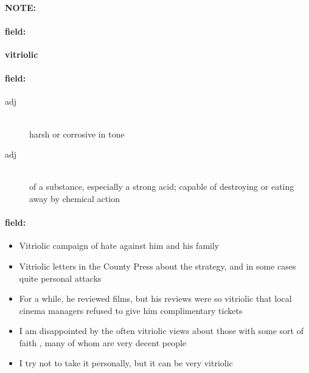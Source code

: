 \documentclass[12pt]{article}
\newenvironment{note}{\paragraph{NOTE:}}{}
\newenvironment{field}{\paragraph{field:}}{}
\begin{document}
\begin{note}
\begin{field}
\textbf{\large vitriolic}
\end{field}


\begin{field}
\begin{description}
\item[adj] \hfill \\ 
harsh or corrosive in tone

\item[adj] \hfill \\ 
of a substance, especially a strong acid; capable of destroying or eating away by chemical action

\end{description}
\end{field}

\begin{field}
\begin{itemize}
\item Vitriolic campaign of hate against him and his family
\item Vitriolic letters in the County Press about the strategy, and in some cases quite personal attacks
\item For a while, he reviewed films, but his reviews were so vitriolic that local cinema managers refused to give him complimentary tickets
\item I am disappointed by the often vitriolic views about those with some sort of faith , many of whom are very decent people
\item I try not to take it personally, but it can be very vitriolic
\end{itemize}
\end{field}
\end{note}
\end{document}
